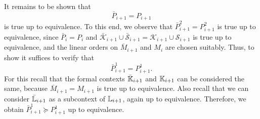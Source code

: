 \begin{Proof}
  It remains to be shown that
  \begin{equation}
    \label{eq:57}
    \bar P_{i+1} = P_{i+1}
  \end{equation}
  is true up to equivalence.  To this end, we observe that $\bar P_{i+1}^{2} =
  P_{i+1}^{2}$ is true up to equivalence, since $\bar P_{i} = P_{i}$ and
  $\bar{\mathcal{K}}_{i+1} \cup \bar{\mathcal{S}}_{i+1} = \mathcal{K}_{i+1} \cup
  \mathcal{S}_{i+1}$ is true up to equivalence, and the linear orders on $\bar M_{i+1}$
  and $M_{i}$ are chosen suitably.  Thus, to show  it suffices to verify that
  \begin{equation}
    \label{eq:58}
    \bar P_{i+1}^{1} = P_{i+1}^{1}.
  \end{equation}
  For this recall that the formal contexts $\bar{{\mathbb{K}}}_{i+1}$ and ${\mathbb{K}}_{i+1}$ can be
  considered the same, because $\bar M_{i+1} = M_{i+1}$ is true up to equivalence.  Also
  recall that we can consider $\bar{{\mathbb{L}}}_{i+1}$ as a subcontext of ${\mathbb{L}}_{i+1}$,
  again up to equivalence.  Therefore, we obtain $\bar P_{i+1}^{1} \succeq P_{i+1}^{1}$ up
  to equivalence.


\end{Proof}
